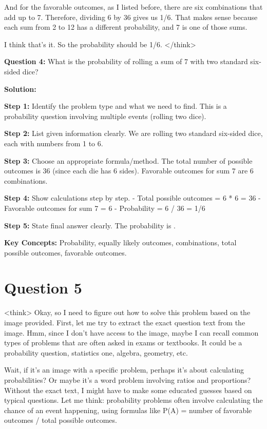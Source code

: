 \documentclass[12pt]{article}
\begin{document}
And for the favorable outcomes, as I listed before, there are six combinations that add up to 7. Therefore, dividing 6 by 36 gives us 1/6. That makes sense because each sum from 2 to 12 has a different probability, and 7 is one of those sums.

I think that's it. So the probability should be 1/6.
</think>

\textbf{Question 4:} What is the probability of rolling a sum of 7 with two standard six-sided dice?

\textbf{Solution:}

\textbf{Step 1:} Identify the problem type and what we need to find. This is a probability question involving multiple events (rolling two dice).

\textbf{Step 2:} List given information clearly. We are rolling two standard six-sided dice, each with numbers from 1 to 6.

\textbf{Step 3:} Choose an appropriate formula/method. The total number of possible outcomes is 36 (since each die has 6 sides). Favorable outcomes for sum 7 are 6 combinations.

\textbf{Step 4:} Show calculations step by step.
- Total possible outcomes = 6 * 6 = 36
- Favorable outcomes for sum 7 = 6
- Probability = 6 / 36 = 1/6

\textbf{Step 5:} State final answer clearly. The probability is .

\textbf{Key Concepts:} Probability, equally likely outcomes, combinations, total possible outcomes, favorable outcomes.
\newpage

\section{Question 5}

<think>
Okay, so I need to figure out how to solve this problem based on the image provided. First, let me try to extract the exact question text from the image. Hmm, since I don't have access to the image, maybe I can recall common types of problems that are often asked in exams or textbooks. It could be a probability question, statistics one, algebra, geometry, etc.

Wait, if it's an image with a specific problem, perhaps it's about calculating probabilities? Or maybe it's a word problem involving ratios and proportions? Without the exact text, I might have to make some educated guesses based on typical questions. Let me think: probability problems often involve calculating the chance of an event happening, using formulas like P(A) = number of favorable outcomes / total possible outcomes.
\end{document}
